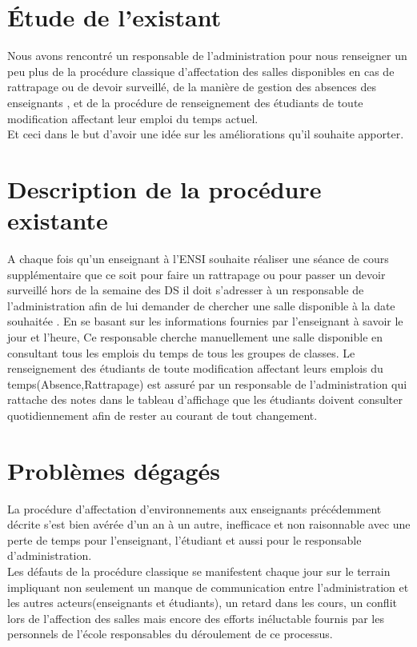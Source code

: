 \documentclass[a4paper,12pt,oneside]{report}
\begin{document}
         \section{Étude de l'existant}
         Nous avons rencontré un responsable de l'administration pour nous renseigner un peu plus de la procédure classique d'affectation  des salles  disponibles en cas de rattrapage ou de devoir surveillé, de la manière de gestion des absences des enseignants , et de la procédure de renseignement des étudiants de toute modification affectant leur emploi du temps actuel.\\
Et ceci dans le but d'avoir une idée sur les améliorations qu'il souhaite apporter. 

  \section{Description de la procédure existante}
   A chaque fois qu'un enseignant à l'ENSI souhaite réaliser une séance de cours supplémentaire que ce soit pour faire un rattrapage ou pour passer un devoir surveillé hors de la semaine des DS il doit s'adresser à un responsable de l'administration afin de lui demander de chercher une salle disponible à la date souhaitée . En se basant sur les informations fournies par l'enseignant à savoir le jour et l'heure, Ce responsable  cherche manuellement une salle disponible en consultant tous les emplois du temps de tous les groupes de classes.
Le renseignement des étudiants de toute modification affectant leurs emplois du temps(Absence,Rattrapage) est assuré par un responsable de l'administration qui rattache des notes dans le tableau d'affichage que les étudiants doivent consulter quotidiennement afin de  rester au courant de tout changement. 

  \section{Problèmes dégagés}
  La procédure d'affectation d'environnements aux enseignants précédemment décrite s'est bien avérée d'un an à un autre, inefficace et non raisonnable avec une perte de temps pour l'enseignant, l'étudiant et aussi pour le responsable d'administration. \\
  Les défauts de la procédure classique se manifestent chaque jour sur le terrain impliquant non seulement un manque de communication entre l'administration et les autres acteurs(enseignants et étudiants), un retard dans les cours, un conflit lors de l'affection des salles mais encore des efforts inéluctable fournis par les personnels de l'école responsables du déroulement de ce processus.
\end{document}
